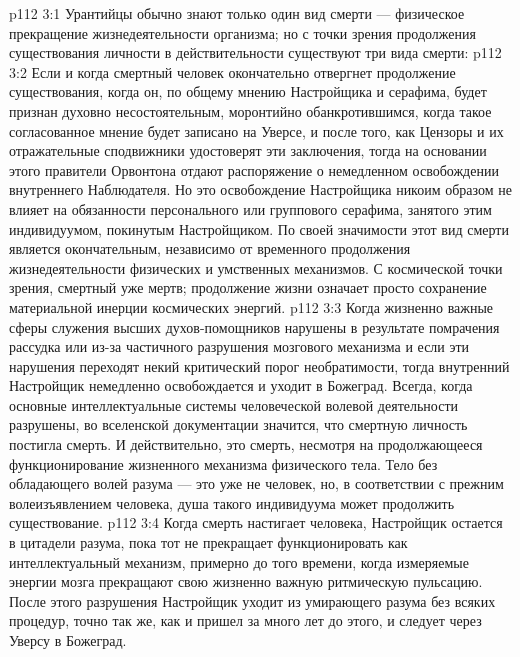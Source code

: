 \vs p112 3:1 Урантийцы обычно знают только один вид смерти --- физическое прекращение жизнедеятельности организма; но с точки зрения продолжения существования личности в действительности существуют три вида смерти:
\vs p112 3:2 \bibnobreakspace {} Если и когда смертный человек окончательно отвергнет продолжение существования, когда он, по общему мнению Настройщика и серафима, будет признан духовно несостоятельным, моронтийно обанкротившимся, когда такое согласованное мнение будет записано на Уверсе, и после того, как Цензоры и их отражательные сподвижники удостоверят эти заключения, тогда на основании этого правители Орвонтона отдают распоряжение о немедленном освобождении внутреннего Наблюдателя. Но это освобождение Настройщика никоим образом не влияет на обязанности персонального или группового серафима, занятого этим индивидуумом, покинутым Настройщиком. По своей значимости этот вид смерти является окончательным, независимо от временного продолжения жизнедеятельности физических и умственных механизмов. С космической точки зрения, смертный уже мертв; продолжение жизни означает просто сохранение материальной инерции космических энергий.
\vs p112 3:3 \bibnobreakspace {} Когда жизненно важные сферы служения высших духов\hyp{}помощников нарушены в результате помрачения рассудка или из\hyp{}за частичного разрушения мозгового механизма и если эти нарушения переходят некий критический порог необратимости, тогда внутренний Настройщик немедленно освобождается и уходит в Божеград. Всегда, когда основные интеллектуальные системы человеческой волевой деятельности разрушены, во вселенской документации значится, что смертную личность постигла смерть. И действительно, это смерть, несмотря на продолжающееся функционирование жизненного механизма физического тела. Тело без обладающего волей разума --- это уже не человек, но, в соответствии с прежним волеизъявлением человека, душа такого индивидуума может продолжить существование.
\vs p112 3:4 \bibnobreakspace {} Когда смерть настигает человека, Настройщик остается в цитадели разума, пока тот не прекращает функционировать как интеллектуальный механизм, примерно до того времени, когда измеряемые энергии мозга прекращают свою жизненно важную ритмическую пульсацию. После этого разрушения Настройщик уходит из умирающего разума без всяких процедур, точно так же, как и пришел за много лет до этого, и следует через Уверсу в Божеград.
